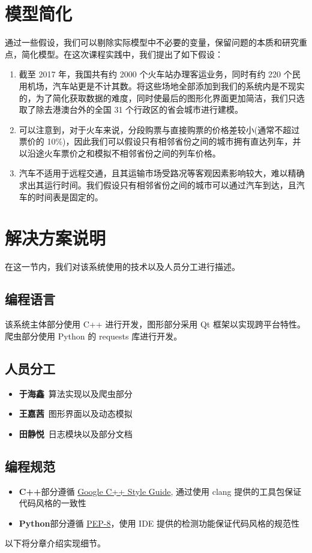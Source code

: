 \documentclass[lang=cn,blue,13pt]{elegantbook}
\begin{document}
\section{模型简化}
通过一些假设，我们可以剔除实际模型中不必要的变量，保留问题的本质和研究重点，简化模型。在这次课程实践中，我们提出了如下假设：
\begin{enumerate}
	\item 截至 2017 年，我国共有约 2000 个火车站办理客运业务，同时有约 220 个民用机场，汽车站更是不计其数。将这些场地全部添加到我们的系统内是不现实的，为了简化获取数据的难度，同时使最后的图形化界面更加简洁，我们只选取了除去港澳台外的全国 31 个行政区的省会城市进行建模。
	\item 可以注意到，对于火车来说，分段购票与直接购票的价格差较小(通常不超过票价的 10\%)，因此我们可以假设只有相邻省份之间的城市拥有直达列车，并以沿途火车票价之和模拟不相邻省份之间的列车价格。
	\item 汽车不适用于远程交通，且其运输市场受路况等客观因素影响较大，难以精确求出其运行时间。我们假设只有相邻省份之间的城市可以通过汽车到达，且汽车的时间表是固定的。
\end{enumerate}

\section{解决方案说明}

在这一节内，我们对该系统使用的技术以及人员分工进行描述。

\subsection{编程语言}

该系统主体部分使用 C++ 进行开发，图形部分采用 Qt 框架以实现跨平台特性。爬虫部分使用 Python 的 requests 库进行开发。

\subsection{人员分工}
\begin{itemize}
	\item \textbf{于海鑫}\ 算法实现以及爬虫部分
	\item \textbf{王嘉茜}\ 图形界面以及动态模拟
	\item \textbf{田静悦}\ 日志模块以及部分文档
\end{itemize}

\subsection{编程规范}
\begin{itemize}
	\item \textbf{C++}部分遵循 \href{http://www.nscscc.org/uploads/soft/170318/1-1F31P20H9.docxhttp://google.github.io/styleguide/cppguide}{Google C++ Style Guide}, 通过使用 clang 提供的工具包保证代码风格的一致性
	\item \textbf{Python}部分遵循 \href{https://www.python.org/dev/peps/pep-0008/}{PEP-8}，使用 IDE 提供的检测功能保证代码风格的规范性
\end{itemize}
\vspace*{3 ex}
以下将分章介绍实现细节。
\end{document}
